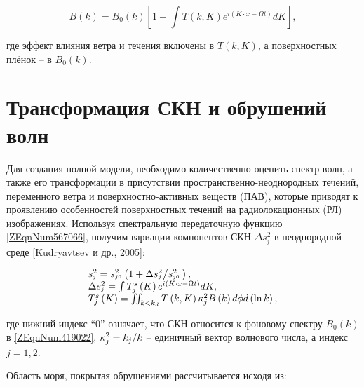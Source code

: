 \begin{equation} \label{1.43)} B\left(k\right)=B_{0} \left(k\right)\left[1+\int T(k,K)e^{i\left(K\cdot x-\Omega t\right)} dK \right],  \end{equation} 



\noindent где эффект влияния ветра и течения включены в $T(k,K)$, а поверхностных плёнок -- в $B_{0} \left(k\right)$.



\section{Трансформация СКН и обрушений волн} \label{AppendixA2}

Для создания полной модели, необходимо количественно оценить спектр волн, а также его трансформации в присутствии пространственно-неоднородных течений, переменного ветра и поверхностно-активных веществ (ПАВ), которые приводят к проявлению особенностей поверхностных течений на радиолокационных (РЛ) изображениях. Используя спектральную передаточную функцию \eqref{ZEqnNum567066}, получим вариации компонентов СКН $\Delta s_{^{j} }^{2} $ в неоднородной среде [Kudryavtsev и др., 2005]:



\begin{equation} \label{1.44)} \begin{array}{l} {s_{^{j} }^{2} =s_{^{j0} }^{2} \left(1+{\Delta s_{^{j} }^{2} \mathord{\left/ {\vphantom {\Delta s_{^{j} }^{2}  s_{^{j0} }^{2} \, }} \right. \kern-\nulldelimiterspace} s_{^{j0} }^{2} \, } \right),} \\ {\Delta s_{^{j} }^{2} =\int T_{j}^{s} \left(K\right)e^{i\left(K\cdot x-\Omega t\right)}  dK,} \\ {T_{j}^{s} \left(K\right)=\iint \nolimits _{k<k_{d} }T\left(k,K\right)\kappa _{j}^{2} B\left(k\right) d\phi d\left(\ln k\right),} \end{array} \end{equation} 



\noindent где нижний индекс ``0'' означает, что СКН относится к фоновому спектру $B_{0} \left(k\right)$ в \eqref{ZEqnNum419022}, $\kappa _{j}^{2} ={k_{j} \mathord{\left/ {\vphantom {k_{j}  k}} \right. \kern-\nulldelimiterspace} k} $ -- единичный вектор волнового числа, а индекс $j=1,2$.

Область моря, покрытая обрушениями рассчитывается исходя из:



